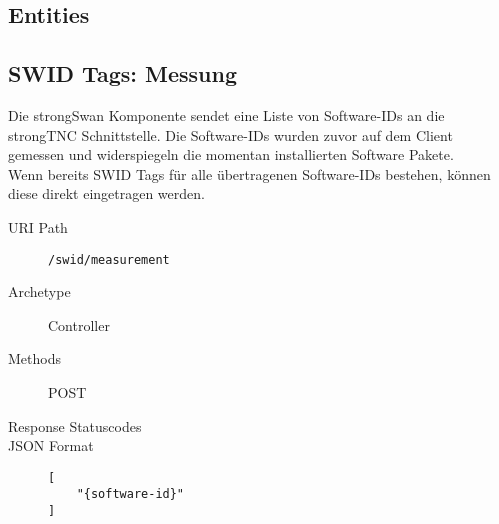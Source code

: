 \documentclass[10pt,a4paper]{scrartcl}
\begin{document}
\pagebreak
\subsection{Entities}


\pagebreak
\subsection{SWID Tags: Messung}

Die strongSwan Komponente sendet eine Liste von Software-IDs an die strongTNC 
Schnittstelle. Die Software-IDs wurden zuvor auf dem Client gemessen und widerspiegeln die momentan
installierten Software Pakete.\\
Wenn bereits SWID Tags für alle übertragenen Software-IDs bestehen, können diese direkt eingetragen werden.
\begin{mdframed}[style=def]
\begin{description}
	\item[URI Path] \texttt{/swid/measurement}
	\item[Archetype] Controller
	\item[Methods] POST
	\item[Response Statuscodes] \hfill
	\item[JSON Format] \hfill
\begin{lstlisting}
[
    "{software-id}"
]
\end{lstlisting}
\end{description}
\end{mdframed}
\end{document}

